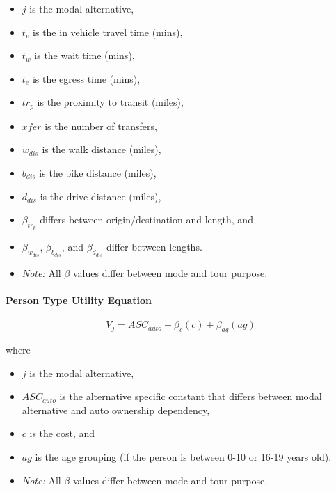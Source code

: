 \documentclass[3p, authoryear, review]{elsarticle} %
\providecommand{\tightlist}{%
  \setlength{\itemsep}{0pt}\setlength{\parskip}{0pt}}
\begin{document}
\begin{itemize}
\tightlist
\item
  \(j\) is the modal alternative,
\item
  \(t_v\) is the in vehicle travel time (mins),
\item
  \(t_w\) is the wait time (mins),
\item
  \(t_e\) is the egress time (mins),
\item
  \(tr_p\) is the proximity to transit (miles),
\item
  \(xfer\) is the number of transfers,
\item
  \(w_{dis}\) is the walk distance (miles),
\item
  \(b_{dis}\) is the bike distance (miles),
\item
  \(d_{dis}\) is the drive distance (miles),
\item
  \(\beta_{tr_p}\) differs between origin/destination and length, and
\item
  \(\beta_{w_{dis}}\), \(\beta_{b_{dis}}\), and \(\beta_{d_{dis}}\) differ between lengths.
\item
  \emph{Note:} All \(\beta\) values differ between mode and tour purpose.
\end{itemize}

\hypertarget{person-type-utility-equation}{%
\paragraph{Person Type Utility Equation}\label{person-type-utility-equation}}

\begin{equation}
  V_j = ASC_{auto} +  \beta_{c}(c) + \beta_{ag}(ag) \label{eq:tpcmperson}
\end{equation}

where

\begin{itemize}
\tightlist
\item
  \(j\) is the modal alternative,
\item
  \(ASC_{auto}\) is the alternative specific constant that differs between modal alternative and auto ownership dependency,
\item
  \(c\) is the cost, and
\item
  \(ag\) is the age grouping (if the person is between 0-10 or 16-19 years old).
\item
  \emph{Note:} All \(\beta\) values differ between mode and tour purpose.
\end{itemize}
\end{document}
